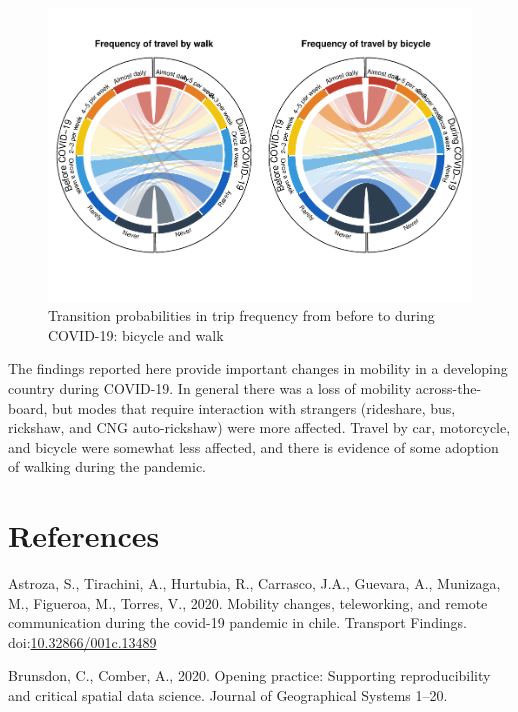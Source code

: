 \documentclass[]{elsarticle} %
\begin{document}
\begin{figure}
\centering
\includegraphics{Frequency-of-Travel-by-Mode-COVID-19-Bangladesh_files/figure-latex/circular-plots-transition-probabilities-4-1.pdf}
\caption{\label{fig:circular-plot-4}Transition probabilities in trip
frequency from before to during COVID-19: bicycle and walk}
\end{figure}

The findings reported here provide important changes in mobility in a
developing country during COVID-19. In general there was a loss of
mobility across-the-board, but modes that require interaction with
strangers (rideshare, bus, rickshaw, and CNG auto-rickshaw) were more
affected. Travel by car, motorcycle, and bicycle were somewhat less
affected, and there is evidence of some adoption of walking during the
pandemic.

\hypertarget{references}{%
\section*{References}\label{references}}

\hypertarget{refs}{}
\leavevmode\hypertarget{ref-Astroza2020mobility}{}%
Astroza, S., Tirachini, A., Hurtubia, R., Carrasco, J.A., Guevara, A.,
Munizaga, M., Figueroa, M., Torres, V., 2020. Mobility changes,
teleworking, and remote communication during the covid-19 pandemic in
chile. Transport Findings.
doi:\href{https://doi.org/10.32866/001c.13489}{10.32866/001c.13489}

\leavevmode\hypertarget{ref-Brunsdon2020opening}{}%
Brunsdon, C., Comber, A., 2020. Opening practice: Supporting
reproducibility and critical spatial data science. Journal of
Geographical Systems 1--20.
\end{document}
